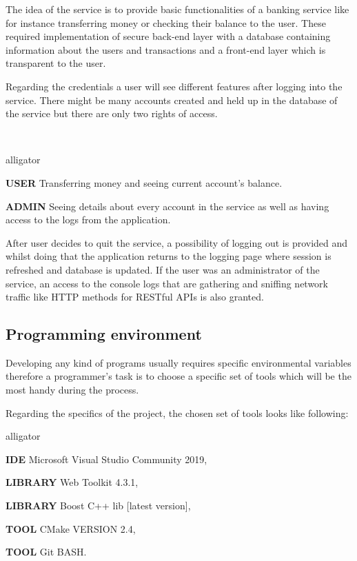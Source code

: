 \documentclass[a4paper,12pt]{article}
\newcommand\tab[1][1cm]{\hspace*{#1}}
\begin{document}
{{\bigskip
The idea of the service is to provide basic functionalities of a banking service like for instance transferring money or checking their balance to the user. These required implementation of secure back-end layer with a database containing information about the users and transactions and a front-end layer which is transparent to the user. 

\bigskip
Regarding the credentials a user will see different features after logging into the service. There might be many accounts created and held up in the database of the service but there are only two rights of access.}\\
\begin{labeling}{alligator}
\item [\textbf{USER}] Transferring money and seeing current account's balance.
\item [\textbf{ADMIN}] Seeing details about every account in the service as well as having access to the logs from the application.
\end{labeling}

\bigskip
After user decides to quit the service, a possibility of logging out is provided and whilst doing that the application returns to the logging page where session is refreshed and database is updated. If the user was an administrator of the service, an access to the console logs that are gathering and sniffing network traffic like HTTP methods for RESTful APIs is also granted.  

\subsection{Programming environment}
{\tab Developing any kind of programs usually requires specific environmental variables therefore a programmer's task is to choose a specific set of tools which will be the most handy during the process.  

\bigskip
Regarding the specifics of the project, the chosen set of tools looks like following:
\begin{labeling}{alligator}
\item [\textbf{IDE}] Microsoft Visual Studio Community 2019,
\item [\textbf{LIBRARY}] Web Toolkit 4.3.1,
\item [\textbf{LIBRARY}] Boost C++ lib [latest version],
\item [\textbf{TOOL}] CMake VERSION 2.4,
\item [\textbf{TOOL}] Git BASH.
\end{labeling}}

}
\end{document}

